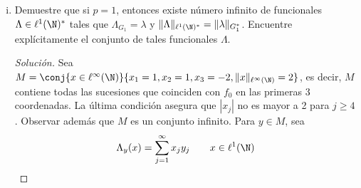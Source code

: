\documentclass[duedate = 11 de Septiembre, 
			ramo = An\'alisis Funcional, 
			doctype = Tarea 1,
			semester = 2,
			year = 2017]{tarea}
\begin{document}
\begin{enumerate}[(i)]
\begin{proof}[Solución]
	La linealidad de $\Lambda$ sigue de la parte (i) y además es claro que $\Lambda\big|_{G_{p}} = \lambda$. Para ver que es acotado, si $f_{0} \in \ell^{p'}(\N)$ es como arriba, entonces por (4.1), si $\|x\|_{\ell^{p}(\N)} = 1$,
		$$|\Lambda(x)| \leq \|f_{0}\|_{\ell^{p'}(\N)} = \|\lambda\|_{G_{p}^{*}}$$
		
	luego $\Lambda \in \ell^{p}(\N)^{*}$. Pero más aún tenemos que
		$$\Lambda(x) = \sum_{j=1}^{\infty} (f_{0})_{j}x_{j}, \qquad x = (x_{1}, \ldots) \in \ell^{p}(\N)$$
	
	y, por el teorema de Riesz,
		$$\|\Lambda\|_{\ell^{p}(\N)^{*}} = \|f_{0}\|_{\ell^{p'}(\N)} = \|\lambda\|_{G_{p}^{*}}$$
	
	Para la unicidad, sea $\varphi \in \ell^{p}(\N)^{*}$ otro funcional que satisface las mismas propiedades. Luego,
		\[ \|\varphi\|_{\ell^{p}(\N)^{*}} = \|\lambda\|_{G_{p}^{*}} = \|f_{0}\|_{\ell^{p'}(\N)}	\tag{4.3} \]
	
	Sea $y \in \ell^{p'}(\N)$ dada por el teorema de Riesz aplicado para $\varphi$. Sean $e_{j} = (\delta_{ij})_{i \in \N}$ para $j = 1, 2,3$. Notar que $e_{j} \in G_{p}$ y
		\begin{align*}
			(f_{0})_{j}	&=	\lambda(e_{j}) = \varphi(e_{j}) = \sum_{k=1}^{\infty} (e_{j})_{k}y_{k} = y_{j}
		\end{align*}
	
	Luego las primeras 3 coordenadas de $y$ coinciden con las de $f_{0}$. Supongamos que $y \neq f_{0}$, eso implica que existe $j \geq 4$ tal que $y_{j} \neq 0$ y por lo tanto
		$$\|y\|_{\ell^{p'}(\N)}^{p} = \sum_{j=1}^{\infty} |y_{j}|^{p'} > \sum_{j=1}^{\infty} |(f_{0})_{j}|^{p'} = \|f_{0}\|_{\ell^{p'}(\N)}$$
	
	lo que en particular implica que $\|\varphi\|_{\ell^{p}(\N)^{*}} > \|f_{0}\|_{\ell^{p'}(\N)}$ contradiciendo (4.3). Así, $y = f_{0}$ y por lo tanto
		$$\varphi(x) = \sum_{j=0}^{\infty} (f_{0})_{j}x_{j} = x_{1} + x_{2} - 2x_{3} = \Lambda(x) \qquad \paratodo x \in \ell^{p}(\N)$$
	
	concluyendo que $\Lambda = \varphi$.
	\end{proof}
	
	\item Demuestre que si $p = 1$, entonces existe número infinito de funcionales $\Lambda \in \ell^{1}(\N)^{*}$ tales que $\Lambda_{G_{1}} = \lambda$ y $\|\Lambda\|_{\ell^{1}(\N)^{*}} = \|\lambda\|_{G_{1}^{*}}$. Encuentre explícitamente el conjunto de tales funcionales $\Lambda$.
	
	\begin{proof}[Solución] Sea $M = \conj{x \in \ell^{\infty}(\N)}{x_{1} = 1, x_{2} = 1, x_{3} = -2, \|x\|_{\ell^{\infty}(\N)} = 2}$, es decir, $M$ contiene todas las sucesiones que coinciden con $f_{0}$ en las primeras 3 coordenadas. La última condición asegura que $|x_{j}|$ no es mayor a 2 para $j \geq 4$. Observar además que $M$ es un conjunto infinito. Para $y \in M$, sea
		$$\Lambda_{y}(x) = \sum_{j=1}^{\infty} x_{j}y_{j} \qquad x \in \ell^{1}(\N)$$
	

\end{proof}
\end{enumerate}
\end{document}

